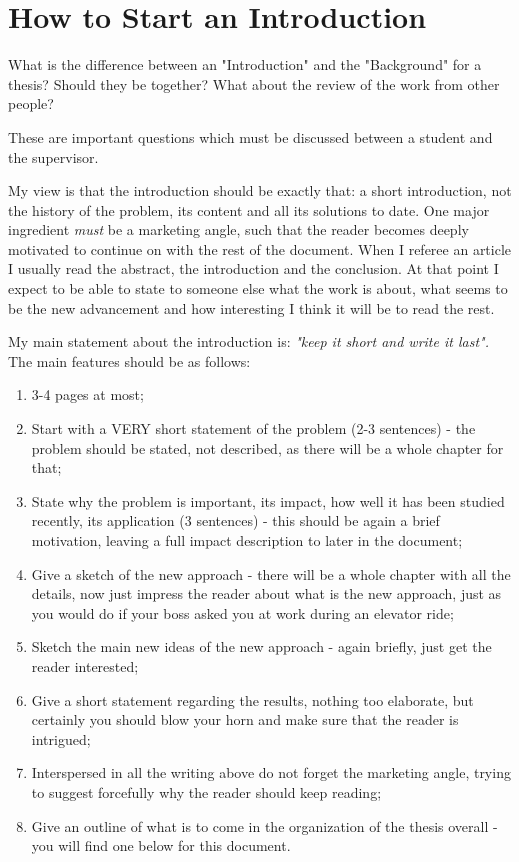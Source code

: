 \section{How to Start an Introduction}


What is the difference between an "Introduction" and the "Background" for a thesis? Should they be together? What about the review of the work from other people?

These are important questions which must be discussed between a student and the supervisor.

My view is that the introduction should be exactly that: a short introduction, not the history of the problem, its content and all its solutions to date. One major ingredient \textit{must} be a marketing angle, such that the reader becomes deeply motivated to continue on with the rest of the document. When I referee an article I usually read the abstract, the introduction and the conclusion. At that point I expect to be able to state to someone else what the work is about, what seems to be the new advancement and how interesting I think it will be to read the rest.

My main statement about the introduction is:
\textit{"keep it short and write it last".} The main features should be as follows:
\begin{enumerate}
\item {3-4 pages at most;}
\item {Start with a VERY short statement of the problem (2-3 sentences) - the problem should be stated, not described, as there will be a whole chapter for that;}
\item {State why the problem is important, its impact, how well it has been studied recently, its application (3 sentences) - this should be again a brief motivation, leaving a full impact description to later in the document;}
\item {Give a sketch of the new approach - there will be a whole chapter with all the details, now just impress the reader about what is the new approach, just as you would do if your boss asked you at work during an elevator ride;}
\item {Sketch the main new ideas of the new approach - again briefly, just get the reader interested;}
\item {Give a short statement regarding the results, nothing too elaborate, but certainly you should blow your horn and make sure that the reader is intrigued;}
\item {Interspersed in all the writing above do not forget the marketing angle, trying to suggest forcefully why the reader should keep reading;}
\item {Give an outline of what is to come in the organization of the thesis overall - you will find one below for this document.}

\end{enumerate}

